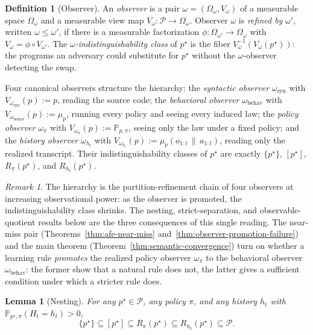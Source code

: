 \documentclass[11pt]{article}
\newtheorem{lemma}[theorem]{Lemma}
\theoremstyle{definition}
\newtheorem{definition}[theorem]{Definition}
\theoremstyle{remark}
\newtheorem{remark}[theorem]{Remark}
\newcommand{\Pcal}{\mathcal{P}}
\newcommand{\Prob}{\mathbb{P}}
\newcommand{\givena}{\,\|\,}
\begin{document}
\begin{definition}[Observer]
\label{def:observer}
An \emph{observer} is a pair $\omega=(\Omega_\omega,V_\omega)$ of a measurable space $\Omega_\omega$ and a measurable view map $V_\omega:\Pcal\to\Omega_\omega$. Observer $\omega$ is \emph{refined by} $\omega'$, written $\omega\le\omega'$, if there is a measurable factorization $\phi:\Omega_{\omega'}\to\Omega_\omega$ with $V_\omega=\phi\circ V_{\omega'}$. The \emph{$\omega$-indistinguishability class} of $p^\star$ is the fiber $V_\omega^{-1}(V_\omega(p^\star))$: the programs an adversary could substitute for $p^\star$ without the $\omega$-observer detecting the swap.
\end{definition}

Four canonical observers structure the hierarchy: the \emph{syntactic observer} $\omega_{\mathrm{syn}}$ with $V_{\omega_{\mathrm{syn}}}(p):=p$, reading the source code; the \emph{behavioral observer} $\omega_{\mathrm{behav}}$ with $V_{\omega_{\mathrm{behav}}}(p):=\mu_p$, running every policy and seeing every induced law; the \emph{policy observer} $\omega_\pi$ with $V_{\omega_\pi}(p):=\Prob_{p,\pi}$, seeing only the law under a fixed policy; and the \emph{history observer} $\omega_{h_t}$ with $V_{\omega_{h_t}}(p):=\mu_p(o_{1:t}\givena a_{1:t})$, reading only the realized transcript. Their indistinguishability classes of $p^\star$ are exactly $\{p^\star\}$, $[p^\star]$, $R_\pi(p^\star)$, and $R_{h_t}(p^\star)$.

\begin{remark}
\label{rem:four-observers}
The hierarchy is the partition-refinement chain of four observers at increasing observational power: as the observer is promoted, the indistinguishability class shrinks. The nesting, strict-separation, and observable-quotient results below are the three consequences of this single reading. The near-miss pair (Theorems~\ref{thm:afe-near-miss} and~\ref{thm:observer-promotion-failure}) and the main theorem (Theorem~\ref{thm:semantic-convergence}) turn on whether a learning rule \emph{promotes} the realized policy observer $\omega_\pi$ to the behavioral observer $\omega_{\mathrm{behav}}$: the former show that a natural rule does not, the latter gives a sufficient condition under which a stricter rule does.
\end{remark}

\begin{lemma}[Nesting]
\label{lem:nesting}
For any $p^\star\in\Pcal$, any policy $\pi$, and any history $h_t$ with $\Prob_{p^\star,\pi}(H_t=h_t)>0$,
\[
\{p^\star\}\subseteq [p^\star]\subseteq R_\pi(p^\star)\subseteq R_{h_t}(p^\star)\subseteq \Pcal.
\]
\end{lemma}
\end{document}
